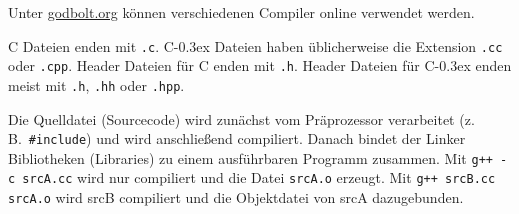 \documentclass[10pt,twocolumn]{scrartcl}
\newcommand*\cpp{C\kern-0.3ex\raisebox{0.17ex}{\texttt{+\kern-0.3ex+}}}
\begin{document}
Unter \href{https://godbolt.org/}{godbolt.org} können verschiedenen Compiler online verwendet werden.

C Dateien enden mit \lstinline|.c|. \cpp{} Dateien haben üblicherweise die
Extension \lstinline|.cc| oder \lstinline|.cpp|. Header Dateien für C enden mit
\lstinline|.h|. Header Dateien für \cpp{} enden meist mit \lstinline|.h|,
\lstinline|.hh| oder \lstinline|.hpp|.

Die Quelldatei (Sourcecode) wird zunächst vom Präprozessor verarbeitet (z.\,B.\
\lstinline|#include|) und wird anschließend compiliert. Danach bindet der Linker
Bibliotheken (Libraries) zu einem ausführbaren Programm zusammen. Mit
\lstinline|g++ -c srcA.cc| wird nur compiliert und die Datei \lstinline|srcA.o|
erzeugt. Mit \lstinline|g++ srcB.cc srcA.o| wird srcB compiliert und die
Objektdatei von srcA dazugebunden.















%
%
%
%
%







\end{document}
